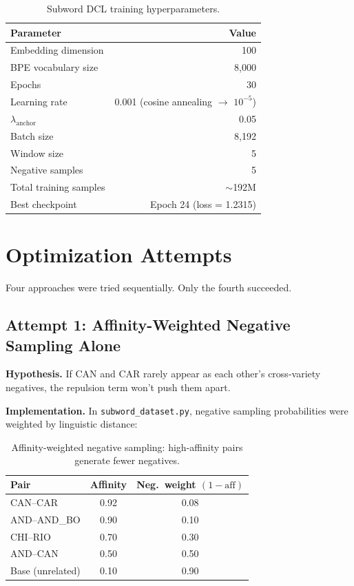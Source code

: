 \documentclass[11pt,a4paper]{article}
\begin{document}
\begin{table}[H]
\centering
\begin{tabular}{@{}lr@{}}
\toprule
\textbf{Parameter} & \textbf{Value} \\
\midrule
Embedding dimension & 100 \\
BPE vocabulary size & 8{,}000 \\
Epochs & 30 \\
Learning rate & 0.001 (cosine annealing $\to$ $10^{-5}$) \\
$\lambda_{\text{anchor}}$ & 0.05 \\
Batch size & 8{,}192 \\
Window size & 5 \\
Negative samples & 5 \\
Total training samples & $\sim$192M \\
Best checkpoint & Epoch 24 (loss = 1.2315) \\
\bottomrule
\end{tabular}
\caption{Subword DCL training hyperparameters.}
\label{tab:hyperparams}
\end{table}

\section{Optimization Attempts}

Four approaches were tried sequentially. Only the fourth succeeded.

\subsection{Attempt 1: Affinity-Weighted Negative Sampling Alone}

\textbf{Hypothesis.} If CAN and CAR rarely appear as each other's cross-variety negatives, the repulsion term won't push them apart.

\textbf{Implementation.} In \texttt{subword\_dataset.py}, negative sampling probabilities were weighted by linguistic distance:

\begin{table}[H]
\centering
\begin{tabular}{@{}lcc@{}}
\toprule
\textbf{Pair} & \textbf{Affinity} & \textbf{Neg.\ weight} $(1 - \text{aff})$ \\
\midrule
CAN--CAR & 0.92 & 0.08 \\
AND--AND\_BO & 0.90 & 0.10 \\
CHI--RIO & 0.70 & 0.30 \\
AND--CAN & 0.50 & 0.50 \\
Base (unrelated) & 0.10 & 0.90 \\
\bottomrule
\end{tabular}
\caption{Affinity-weighted negative sampling: high-affinity pairs generate fewer negatives.}
\end{table}
\end{document}
